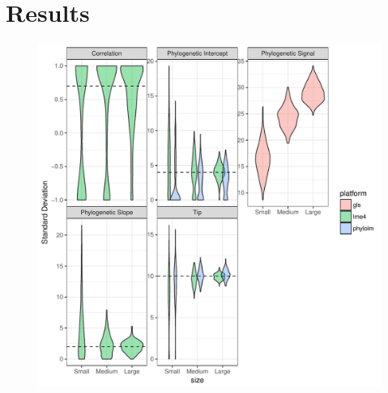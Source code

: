 % 
% 

\section{Results}

\begin{center}
\begin{figure}[h]
\includegraphics[scale=0.8,page=1]{./git_push/ssplot.pdf}
\label{ssplot}
\end{figure}
\end{center}

